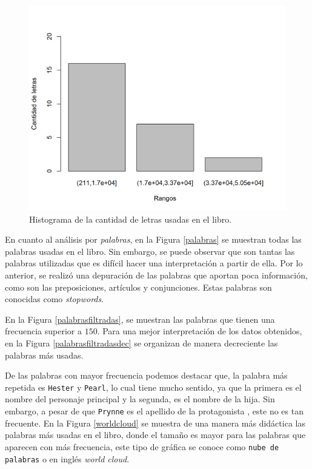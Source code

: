 \documentclass[fontsize=12pt]{article}
\begin{document}
\begin{figure}
\centering
\includegraphics[scale=0.6]{Figures/histDeLetrasFiltradas.png}
\caption{Histograma de la cantidad de letras usadas en el libro.}
\label{histograma}
\end{figure}

En cuanto al análisis por \emph{palabras}, en la Figura \ref{palabras} se muestran todas las palabras usadas en el libro. Sin embargo, se puede observar que son tantas las palabras utilizadas que es difícil hacer una interpretación a partir de ella. Por lo anterior, se realizó una depuración de las palabras que aportan poca información, como son las preposiciones, artículos y conjunciones. Estas palabras son conocidas como \textit{stopwords}. 

En la Figura \ref{palabrasfiltradas}, se muestran las palabras que tienen una frecuencia superior a $150$. Para una mejor interpretación de los datos obtenidos, en la Figura \ref{palabrasfiltradasdec} se organizan de manera decreciente las palabras más usadas. 

De las palabras con mayor frecuencia podemos destacar que, la palabra más repetida es \texttt{Hester} y \texttt{Pearl}, lo cual tiene mucho sentido, ya que la primera es el nombre del personaje principal y la segunda, es el nombre de la hija. Sin embargo, a pesar de que \texttt{Prynne} es el apellido de la protagonista , este no es tan frecuente. En la Figura \ref{worldcloud} se muestra de una manera más didáctica las palabras más usadas en el libro, donde el tamaño es mayor para las palabras que aparecen con más frecuencia, este tipo de gráfica se conoce como \texttt{nube de palabras} o en inglés \textit{world cloud}.
\end{document}
